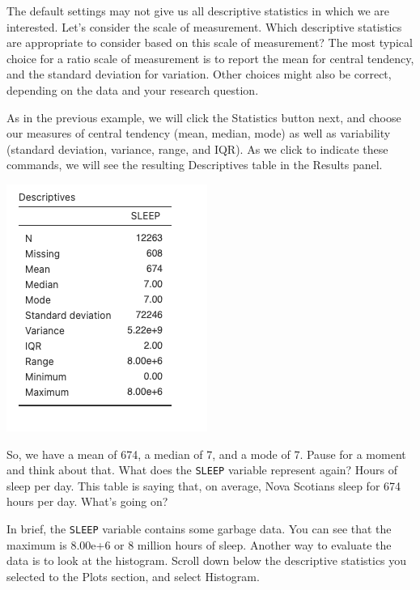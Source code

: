 \documentclass[
]{book}
\begin{document}
The default settings may not give us all descriptive statistics in which we are interested. Let's consider the scale of measurement. Which descriptive statistics are appropriate to consider based on this scale of measurement? The most typical choice for a ratio scale of measurement is to report the mean for central tendency, and the standard deviation for variation. Other choices might also be correct, depending on the data and your research question.

As in the previous example, we will click the {Statistics} button next, and choose our measures of central tendency {(mean, median, mode)} as well as variability ({standard deviation, variance, range}, and {IQR}). As we click to indicate these commands, we will see the resulting Descriptives table in the Results panel.

\includegraphics{img/sleepdescriptives.png}

So, we have a mean of 674, a median of 7, and a mode of 7. Pause for a moment and think about that. What does the \texttt{SLEEP} variable represent again? Hours of sleep per day. This table is saying that, on average, Nova Scotians sleep for 674 hours per day. What's going on?

In brief, the \texttt{SLEEP} variable contains some garbage data. You can see that the maximum is 8.00e+6 or 8 million hours of sleep. Another way to evaluate the data is to look at the histogram. Scroll down below the descriptive statistics you selected to the Plots section, and select Histogram.
\end{document}
